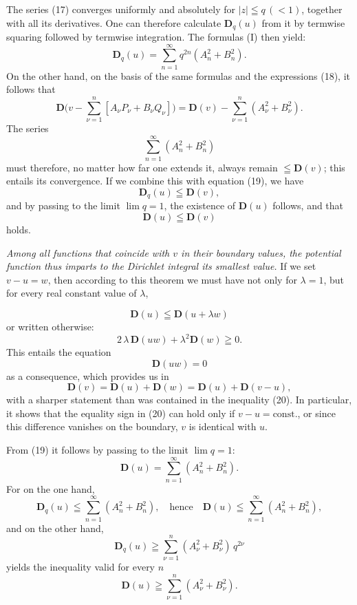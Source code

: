 \documentclass{article}
\begin{document}
The series (17) converges uniformly and absolutely for $|z| \leqq q\,(< 1)$, together with all its derivatives. One can therefore calculate $\mathbf{D}_q(u)$ from it by termwise squaring followed by termwise integration. The formulas (I) then yield:
\[ \mathbf{D}_q(u) = \sum_{n=1}^\infty q^{2n}(A_n^2 + B_n^2). \tag{19} \]
On the other hand, on the basis of the same formulas and the expressions (18), it follows that
\[ \mathbf{D}\Big( v - \sum_{\nu=1}^n [A_\nu P_\nu + B_\nu Q_\nu] \Big) = \mathbf{D}(v) - \sum_{\nu=1}^n (A_\nu^2 + B_\nu^2). \]
The series
\[ \sum_{n=1}^\infty (A_n^2 + B_n^2) \]
must therefore, no matter how far one extends it, always remain $\leqq \mathbf{D}(v)$; this entails its convergence. If we combine this with equation (19), we have
\[ \mathbf{D}_q(u) \leqq \mathbf{D}(v), \]
and by passing to the limit $\lim q = 1$, the existence of $\mathbf{D}(u)$ follows, and that
\[ \mathbf{D}(u) \leqq \mathbf{D}(v) \tag{20} \]
holds.

\emph{Among all functions that coincide with $v$ in their boundary values, the potential function thus imparts to the Dirichlet integral its smallest value.} If we set $v - u = w$, then according to this theorem we must have not only for $\lambda = 1$, but for every real constant value of $\lambda$,

\[ \mathbf{D}(u) \leqq \mathbf{D}(u + \lambda w) \]
or written otherwise:
\[ 2\,\lambda\,\mathbf{D}(uw) + \lambda^2 \mathbf{D}(w) \geqq 0. \]
This entails the equation
\[ \mathbf{D}(uw) = 0 \]
as a consequence, which provides us in
\[ \mathbf{D}(v) = \mathbf{D}(u) + \mathbf{D}(w) = \mathbf{D}(u) + \mathbf{D}(v - u), \]
with a sharper statement than was contained in the inequality (20). In particular, it shows that the equality sign in (20) can hold only if $v - u = \mathrm{const.}$, or since this difference vanishes on the boundary, $v$ is identical with $u$.

From (19) it follows by passing to the limit $\lim q = 1$:
\[ \mathbf{D}(u) = \sum_{n=1}^\infty (A_n^2 + B_n^2). \tag{21} \]
For on the one hand,
\[ \mathbf{D}_q(u) \leqq \sum_{n=1}^\infty (A_n^2 + B_n^2), \quad \text{hence} \quad \mathbf{D}(u) \leqq \sum_{n=1}^\infty (A_n^2 + B_n^2), \]
and on the other hand,
\[ \mathbf{D}_q(u) \geqq \sum_{\nu=1}^n (A_\nu^2 + B_\nu^2)\,q^{2\nu} \]
yields the inequality valid for every $n$
\[ \mathbf{D}(u) \geqq \sum_{\nu=1}^n (A_\nu^2 + B_\nu^2). \]
\end{document}
